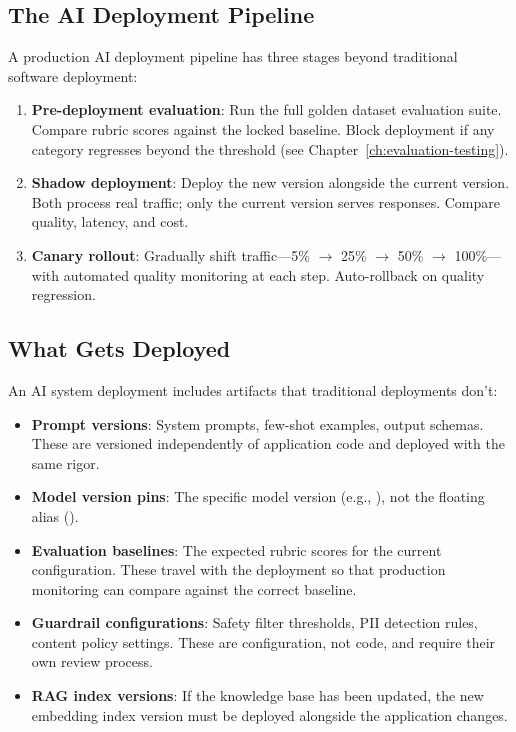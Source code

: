 \subsection{The AI Deployment Pipeline}

A production AI deployment pipeline has three stages beyond traditional software deployment:

\begin{enumerate}[leftmargin=*]
    \item \textbf{Pre-deployment evaluation}: Run the full golden dataset evaluation suite. Compare rubric scores against the locked baseline. Block deployment if any category regresses beyond the threshold (see Chapter~\ref{ch:evaluation-testing}).
    \item \textbf{Shadow deployment}: Deploy the new version alongside the current version. Both process real traffic; only the current version serves responses. Compare quality, latency, and cost.
    \item \textbf{Canary rollout}: Gradually shift traffic---5\% $\to$ 25\% $\to$ 50\% $\to$ 100\%---with automated quality monitoring at each step. Auto-rollback on quality regression.
\end{enumerate}

\subsection{What Gets Deployed}

An AI system deployment includes artifacts that traditional deployments don't:

\begin{itemize}[leftmargin=*]
    \item \textbf{Prompt versions}: System prompts, few-shot examples, output schemas. These are versioned independently of application code and deployed with the same rigor.
    \item \textbf{Model version pins}: The specific model version (e.g., ), not the floating alias ().
    \item \textbf{Evaluation baselines}: The expected rubric scores for the current configuration. These travel with the deployment so that production monitoring can compare against the correct baseline.
    \item \textbf{Guardrail configurations}: Safety filter thresholds, PII detection rules, content policy settings. These are configuration, not code, and require their own review process.
    \item \textbf{RAG index versions}: If the knowledge base has been updated, the new embedding index version must be deployed alongside the application changes.
\end{itemize}

